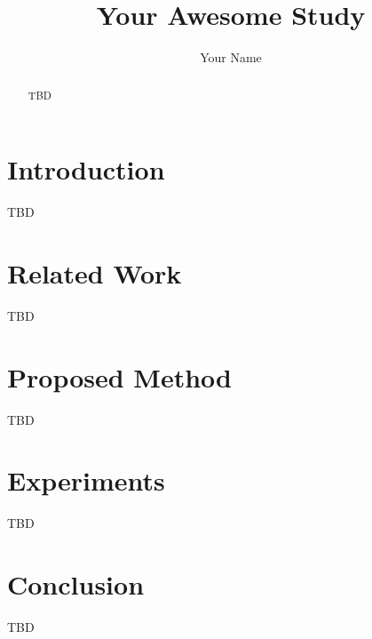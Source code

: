 \documentclass[]{article}
\title{Your Awesome Study}
\author{Your Name}
\begin{document}
\maketitle

\begin{abstract}

TBD

\end{abstract}

\section{Introduction}

TBD

\section{Related Work}

TBD \cite{Doe2019}

\section{Proposed Method}

TBD

\section{Experiments}

TBD

\section{Conclusion}

TBD


\end{document}
